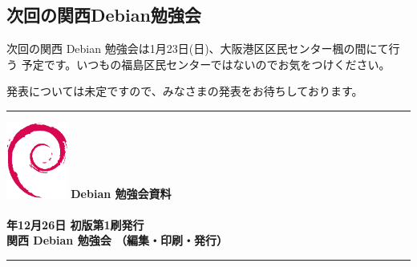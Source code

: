 \documentclass[mingoth,a4paper]{jsarticle}
\newcommand{\debmtgyear}{2010}
\newcommand{\debmtgdate}{26}
\newcommand{\debmtgmonth}{12}
\begin{document}
\clearpage


\subsection{次回の関西Debian勉強会}
次回の関西 Debian 勉強会は1月23日(日)、大阪港区区民センター楓の間にて行う
予定です。いつもの福島区民センターではないのでお気をつけください。

発表については未定ですので、みなさまの発表をお待ちしております。



 \cleartooddpage

 \begin{minipage}[b]{0.2\hsize}
 \end{minipage}
 \begin{minipage}[b]{0.8\hsize}

 \vspace*{15cm}
 \rule{\hsize}{1mm}
 \vspace{2mm}
 \includegraphics[width=2cm]{image200502/openlogo-nd.eps}
 \noindent \Large \bf Debian 勉強会資料\\ \\
 \noindent \normalfont \debmtgyear{}年\debmtgmonth{}月\debmtgdate{}日 \hspace{5mm}  初版第1刷発行\\
 \noindent \normalfont 関西 Debian 勉強会 （編集・印刷・発行）\\
 \rule{\hsize}{1mm}
 \end{minipage}
\end{document}
